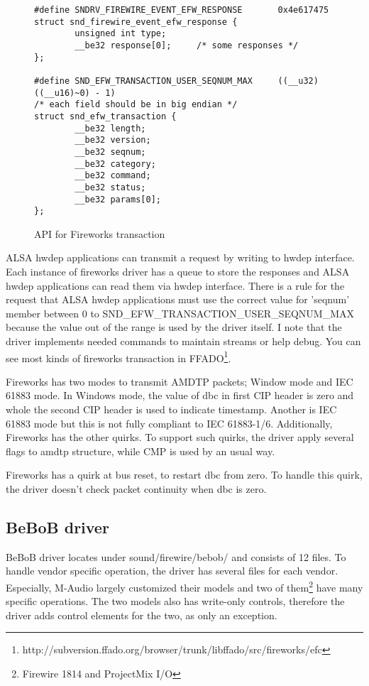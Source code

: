 \documentclass[onecolumn]{jarticle}
\begin{document}
\begin{figure}[H]
\small
\begin{verbatim}
#define SNDRV_FIREWIRE_EVENT_EFW_RESPONSE       0x4e617475
struct snd_firewire_event_efw_response {
        unsigned int type;
        __be32 response[0];     /* some responses */
};

#define SND_EFW_TRANSACTION_USER_SEQNUM_MAX     ((__u32)((__u16)~0) - 1)
/* each field should be in big endian */
struct snd_efw_transaction {
        __be32 length;
        __be32 version;
        __be32 seqnum;
        __be32 category;
        __be32 command;
        __be32 status;
        __be32 params[0];
};
\end{verbatim}
\caption{API for Fireworks transaction}
\label{uapi-fireworks-transaction}
\end{figure}

ALSA hwdep applications can transmit a request by writing to hwdep interface. Each instance of fireworks driver has a queue to store the responses and ALSA hwdep applications can read them via hwdep interface. There is a rule for the request that ALSA hwdep applications must use the correct value for 'seqnum' member between 0 to SND\_EFW\_TRANSACTION\_USER\_SEQNUM\_MAX because the value out of the range is used by the driver itself. I note that the driver implements needed commands to maintain streams or help debug. You can see most kinds of fireworks transaction in FFADO\footnote{http://subversion.ffado.org/browser/trunk/libffado/src/fireworks/efc}.

Fireworks has two modes to transmit AMDTP packets; Window mode and IEC 61883 mode. In Windows mode, the value of dbc in first CIP header is zero and whole the second CIP header is used to indicate timestamp. Another is IEC 61883 mode but this is not fully compliant to IEC 61883-1/6. Additionally, Fireworks has the other quirks. To support such quirks, the driver apply several flags to amdtp structure, while CMP is used by an usual way.

Fireworks has a quirk at bus reset, to restart dbc from zero. To handle this quirk, the driver doesn't check packet continuity when dbc is zero.

\subsection{BeBoB driver}

BeBoB driver locates under sound/firewire/bebob/ and consists of 12 files. To handle vendor specific operation, the driver has several files for each vendor. Especially, M-Audio largely customized their models and two of them\footnote{Firewire 1814 and ProjectMix I/O} have many specific operations. The two models also has write-only controls, therefore the driver adds control elements for the two, as only an exception.
\end{document}
